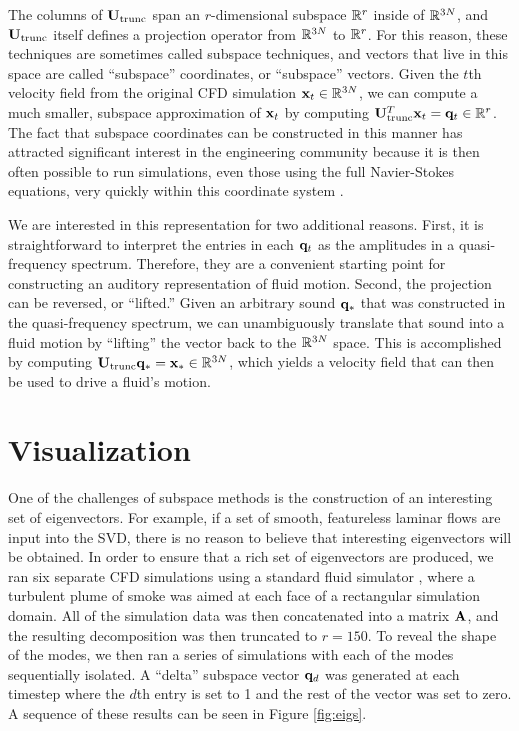\documentclass[11pt]{article}
\begin{document}

The columns of $\mathbf{U}_{\textnormal{trunc}}$ span an $r$-dimensional subspace $\mathbb{R}^r$ inside of $\mathbb{R}^{3N}$, and $\mathbf{U}_{\textnormal{trunc}}$ itself defines a projection operator from $\mathbb{R}^{3N}$ to $\mathbb{R}^r$. For this reason, these techniques are sometimes called subspace techniques, and vectors that live in this space are called ``subspace'' coordinates, or ``subspace'' vectors. Given the $t$th velocity field from the original CFD simulation $\mathbf{x}_t \in \mathbb{R}^{3N}$, we can compute a much smaller, subspace approximation of $\mathbf{x}_t$ by computing $\mathbf{U}_{\textnormal{trunc}}^T \mathbf{x}_t = \mathbf{q}_t \in \mathbb{R}^r$. The fact that subspace coordinates can be constructed in this manner has attracted significant interest in the engineering community because it is then often possible to run simulations, even those using the full Navier-Stokes equations, very quickly within this coordinate system \cite{Kim2013}.

We are interested in this representation for two additional reasons. First, it is straightforward to interpret the entries in each $\mathbf{q}_t$ as the amplitudes in a quasi-frequency spectrum. Therefore, they are a convenient starting point for constructing an auditory representation of fluid motion. Second, the projection can be reversed, or ``lifted.'' Given an arbitrary sound $\mathbf{q}_*$ that was constructed in the quasi-frequency spectrum, we can unambiguously translate that sound into a fluid motion by ``lifting'' the vector back to the $\mathbb{R}^{3N}$ space. This is accomplished by computing $\mathbf{U}_{\textnormal{trunc}} \mathbf{q}_* = \mathbf{x}_*\in \mathbb{R}^{3N}$, which yields a velocity field that can then be used to drive a fluid's motion.

\section*{Visualization}

One of the challenges of subspace methods is the construction of an interesting set of eigenvectors. For example, if a set of smooth, featureless laminar flows are input into the SVD, there is no reason to believe that interesting eigenvectors will be obtained. In order to ensure that a rich set of eigenvectors are produced, we ran six separate CFD simulations using a standard fluid simulator \cite{Stam99}, where a turbulent plume of smoke was aimed at each face of a rectangular simulation domain. All of the simulation data was then concatenated into a matrix $\mathbf{A}$, and the resulting decomposition was then truncated to $r = 150$. To reveal the shape of the modes, we then ran a series of simulations with each of the modes sequentially isolated. A ``delta'' subspace vector $\mathbf{q}_d$ was generated at each timestep where the $d$th entry is set to 1 and the rest of the vector was set to zero. A sequence of these results can be seen in Figure \ref{fig:eigs}.
\end{document}
